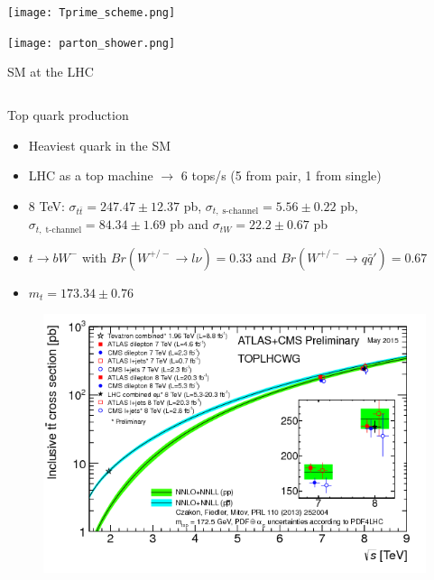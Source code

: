 \begin{frame}{}
\vspace{-.2cm}
\begin{center}
    \texttt{[image: Tprime\_scheme.png]}
  \end{center}
\end{frame}

\iffalse
\begin{frame}{}
\vspace{-.2cm}
\begin{center}
    \texttt{[image: parton\_shower.png]}
  \end{center}
\end{frame}


\begin{frame}{SM at the LHC}
\vspace{-.3cm}
\begin{columns}

\begin{column}{.50\textwidth}
\begin{block}{Top quark production}
\begin{itemize}\tiny
\item Heaviest quark in the SM 
\item LHC as a top machine $\to$ 6 tops/s (5 from pair, 1 from single)
\item 8 TeV: $\sigma_{t\bar{t}}=247.47\pm12.37$ pb, $\sigma_{t,\; \text{s-channel}}=5.56\pm0.22$ pb, $\sigma_{t,\; \text{t-channel}}=84.34\pm1.69$ pb and $\sigma_{tW}=22.2\pm0.67$ pb
\item $t\to bW^{-}$ with $Br(W^{+/-}\to l\nu)=0.33$ and $Br(W^{+/-}\to q\bar{q}')=0.67$
\item $m_{t}=173.34\pm 0.76$ \GeVcc
\end{itemize}
\end{block}

\vspace{-.4cm}
\begin{figure}[!Hhtbp]
  \begin{center}
    \includegraphics[width=1.0\textwidth]{../figs/toplhcwg_ttxsec_sqrts_may2015.png}
  \end{center}
\end{figure}
\end{column}


\end{columns}
\end{frame}
